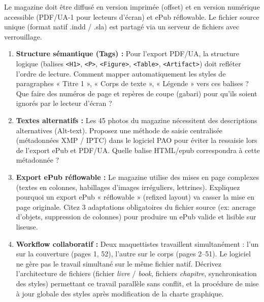 \documentclass[11pt]{article}
\begin{document}
\begin{exercice}
Le magazine doit être diffusé en version imprimée (offset) et en version numérique accessible (PDF/UA-1 pour lecteurs d'écran) et ePub réflowable. Le fichier source unique (format natif .indd / .sla) est partagé via un serveur de fichiers avec verrouillage.

\begin{enumerate}
    \item \textbf{Structure sémantique (Tags) :} Pour l'export PDF/UA, la structure logique (balises \texttt{<H1>}, \texttt{<P>}, \texttt{<Figure>}, \texttt{<Table>}, \texttt{<Artifact>}) doit refléter l'ordre de lecture. Comment mapper automatiquement les styles de paragraphes « Titre 1 », « Corps de texte », « Légende » vers ces balises ? Que faire des numéros de page et repères de coupe (gabari) pour qu'ils soient ignorés par le lecteur d'écran ?
    \item \textbf{Textes alternatifs :} Les 45 photos du magazine nécessitent des descriptions alternatives (Alt-text). Proposez une méthode de saisie centralisée (métadonnées XMP / IPTC) dans le logiciel PAO pour éviter la ressaisie lors de l'export ePub et PDF/UA. Quelle balise HTML/epub correspondra à cette métadonnée ?
    \item \textbf{Export ePub réflowable :} Le magazine utilise des mises en page complexes (textes en colonnes, habillages d'images irréguliers, lettrines). Expliquez pourquoi un export ePub « réflowable » (refixed layout) va casser la mise en page originale. Citez 3 adaptations obligatoires du fichier source (ex: ancrage d'objets, suppression de colonnes) pour produire un ePub valide et lisible sur liseuse.
    \item \textbf{Workflow collaboratif :} Deux maquettistes travaillent simultanément : l'un sur la couverture (pages 1, 52), l'autre sur le corps (pages 2--51). Le logiciel ne gère pas le travail simultané sur le même fichier natif. Décrivez l'architecture de fichiers (fichier \textit{livre} / \textit{book}, fichiers \textit{chapitre}, synchronisation des styles) permettant ce travail parallèle sans conflit, et la procédure de mise à jour globale des styles après modification de la charte graphique.
\end{enumerate}
\end{exercice}
\end{document}
